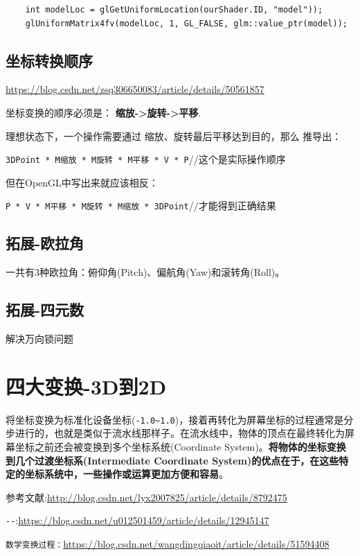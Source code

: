 \documentclass[UTF8,a4paper,12pt]{ctexbook}
\begin{document}
		\begin{lstlisting}
	int modelLoc = glGetUniformLocation(ourShader.ID, "model"));
	glUniformMatrix4fv(modelLoc, 1, GL_FALSE, glm::value_ptr(model));		
		\end{lstlisting}
	
	
	\section{坐标转换顺序}
		\url{https://blog.csdn.net/zsq306650083/article/details/50561857}
		
		坐标变换的顺序必须是： \textbf{缩放->旋转->平移}.
		
		理想状态下，一个操作需要通过  缩放、旋转最后平移达到目的，那么 推导出：
		
		\verb|3DPoint * M缩放 * M旋转 * M平移 * V * P|//这个是实际操作顺序
		
		但在OpenGL中写出来就应该相反：
		
		\verb|P * V * M平移 * M旋转 * M缩放 * 3DPoint|//才能得到正确结果
		
	
	
	\section{拓展-欧拉角}	
		一共有3种欧拉角：俯仰角(Pitch)、偏航角(Yaw)和滚转角(Roll)。
	
	
	\section{拓展-四元数}
		解决万向锁问题
		
		
		
\chapter{四大变换-3D到2D}
	
	将坐标变换为标准化设备坐标(\verb|-1.0~1.0|)，接着再转化为屏幕坐标的过程通常是分步进行的，也就是类似于流水线那样子。在流水线中，物体的顶点在最终转化为屏幕坐标之前还会被变换到多个坐标系统(Coordinate System)。\textbf{将物体的坐标变换到几个过渡坐标系(Intermediate Coordinate System)的优点在于，在这些特定的坐标系统中，一些操作或运算更加方便和容易}。
	
	参考文献:\url{http://blog.csdn.net/lyx2007825/article/details/8792475}
	
	\verb|--|:\url{https://blog.csdn.net/u012501459/article/details/12945147}
	
	\verb|数学变换过程：|\url{https://blog.csdn.net/wangdingqiaoit/article/details/51594408}
		
\end{document}
